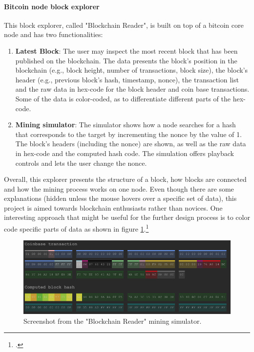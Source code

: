 \paragraph{Bitcoin node block explorer} This block explorer, called "Blockchain Reader", is built on top of a bitcoin core node and has two functionalities:
\begin{enumerate}
    \item \textbf{Latest Block}: The user may inspect the most recent block that has been published on the blockchain. The data presents the block's position in the blockchain (e.g., block height, number of transactions, block size), the block's header (e.g., previous block's hash, timestamp, nonce), the transaction list and the raw data in hex-code for the block header and coin base transactions. Some of the data is color-coded, as to differentiate different parts of the hex-code.
    \item \textbf{Mining simulator}: The simulator shows how a node searches for a hash that corresponds to the target by incrementing the nonce by the value of 1. The block's headers (including the nonce) are shown, as well as the raw data in hex-code and the computed hash code. The simulation offers playback controls and lets the user change the nonce.
\end{enumerate}
Overall, this explorer presents the structure of a block, how blocks are connected and how the mining process works on one node. Even though there are some explanations (hidden unless the mouse hovers over a specific set of data), this project is aimed towards blockchain enthusiasts rather than novices. One interesting approach that might be useful for the further design process is to color code specific parts of data as shown in figure \ref{fig:BlockchainReader}.\footcite[Cf.][]{JornCYoghBlockchainReader2017}

\begin{figure}
    \centering
    \includegraphics[width=\linewidth]{latex-vorlage_v1.5/graphics/Bildschirmfo.png}
    \caption[Screenshot from the "Blockchain Reader" mining simulator.]{Screenshot from the "Blockchain Reader" mining simulator.\protect\footnotemark}
    \label{fig:BlockchainReader}
\end{figure}

